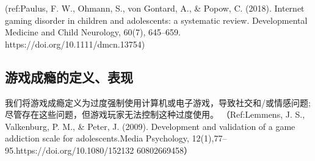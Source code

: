 (ref:Paulus, F. W., Ohmann, S., von Gontard, A., & Popow, C. (2018). Internet gaming disorder in children and adolescents: a systematic review. Developmental Medicine and Child Neurology, 60(7), 645–659. https://doi.org/10.1111/dmcn.13754)






\subsection{游戏成瘾的定义、表现}

我们将游戏成瘾定义为过度强制使用计算机或电子游戏，导致社交和/或情感问题; 尽管存在这些问题，但游戏玩家无法控制这种过度使用。
（Ref:Lemmens, J. S., Valkenburg, P. M., & Peter, J. (2009). Development and validation of a game addiction scale for adolescents.Media Psychology, 12(1),77–95.https://doi.org/10.1080/152132
60802669458）




